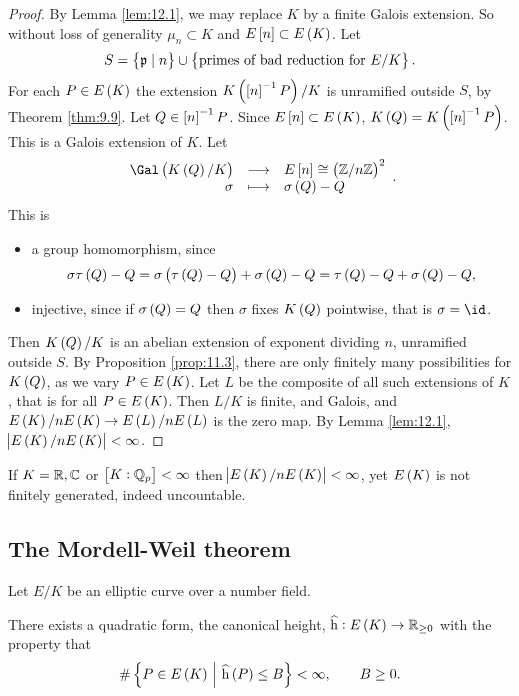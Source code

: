 \begin{proof}
By Lemma \ref{lem:12.1}, we may replace $ K $ by a finite Galois extension. So without loss of generality $ \mu_n \subset K $ and $ E\sbr{n} \subset E\br{K} $. Let
$$ S = \cbr{\ppp \mid n} \cup \cbr{\text{primes of bad reduction for} \ E / K}. $$
For each $ P \in E\br{K} $ the extension $ K\br{\sbr{n}^{-1}P} / K $ is unramified outside $ S $, by Theorem \ref{thm:9.9}. Let $ Q \in \sbr{n}^{-1}P $. Since $ E\sbr{n} \subset E\br{K} $, $ K\br{Q} = K\br{\sbr{n}^{-1}P} $. This is a Galois extension of $ K $. Let
$$ \function{\Gal\br{K\br{Q} / K}}{E\sbr{n} \cong \br{\ZZ / n\ZZ}^2}{\sigma}{\sigma\br{Q} - Q}. $$
This is
\begin{itemize}
\item a group homomorphism, since
$$ \sigma\tau\br{Q} - Q = \sigma\br{\tau\br{Q} - Q} + \sigma\br{Q} - Q = \tau\br{Q} - Q + \sigma\br{Q} - Q, $$
\item injective, since if $ \sigma\br{Q} = Q $ then $ \sigma $ fixes $ K\br{Q} $ pointwise, that is $ \sigma = \id $.
\end{itemize}
Then $ K\br{Q} / K $ is an abelian extension of exponent dividing $ n $, unramified outside $ S $. By Proposition \ref{prop:11.3}, there are only finitely many possibilities for $ K\br{Q} $, as we vary $ P \in E\br{K} $. Let $ L $ be the composite of all such extensions of $ K $, that is for all $ P \in E\br{K} $. Then $ L / K $ is finite, and Galois, and $ E\br{K} / nE\br{K} \to E\br{L} / nE\br{L} $ is the zero map. By Lemma \ref{lem:12.1}, $ \abs{E\br{K} / nE\br{K}} < \infty $.
\end{proof}

\begin{remark*}
If $ K = \mathbb{R}, \mathbb{C} $ or $ \sbr{K : \QQ_p} < \infty $ then $ \abs{E\br{K} / nE\br{K}} < \infty $, yet $ E\br{K} $ is not finitely generated, indeed uncountable.
\end{remark*}

\pagebreak

\subsection{The Mordell-Weil theorem}

Let $ E / K $ be an elliptic curve over a number field.

\begin{fact*}
There exists a quadratic form, the canonical height, $ \widehat{\h} : E\br{K} \to \RR_{\ge 0} $ with the property that
\begin{equation}
\label{eq:13}
\#\cbr{P \in E\br{K} \st \widehat{\h}\br{P} \le B} < \infty, \qquad B \ge 0.
\end{equation}
\end{fact*}

